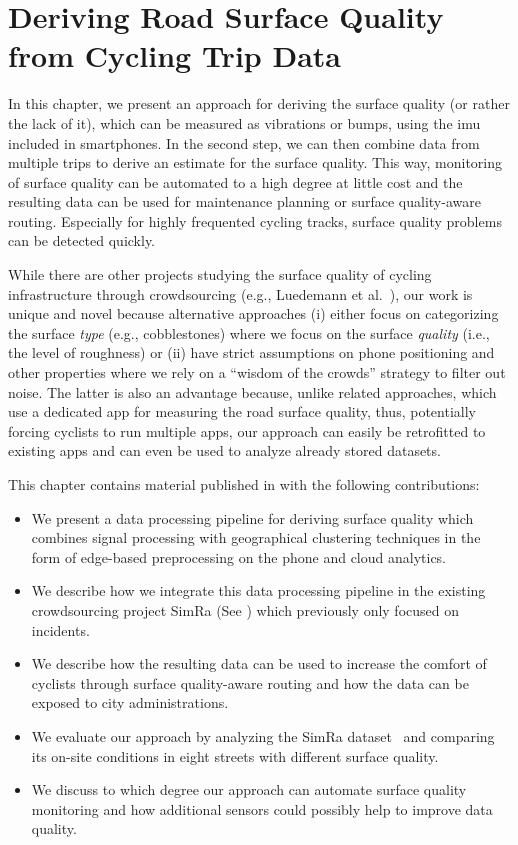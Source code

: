 \chapter{Deriving Road Surface Quality from Cycling Trip Data}
\label{cha:cyclequality}
In this chapter, we present an approach for deriving the surface quality (or rather the lack of it), which can be measured as vibrations or bumps, using the \ac{imu} included in smartphones.
In the second step, we can then combine data from multiple trips to derive an estimate for the surface quality.
This way, monitoring of surface quality can be automated to a high degree at little cost and the resulting data can be used for maintenance planning or surface quality-aware routing.
Especially for highly frequented cycling tracks, surface quality problems can be detected quickly.

While there are other projects studying the surface quality of cycling infrastructure through crowdsourcing (e.g., Luedemann et al.~\cite{luedemann2022bikevibes}), our work is unique and novel because alternative approaches (i) either focus on categorizing the surface \emph{type} (e.g., cobblestones) where we focus on the surface \emph{quality} (i.e., the level of roughness) or (ii) have strict assumptions on phone positioning and other properties where we rely on a ``wisdom of the crowds'' strategy to filter out noise.
The latter is also an advantage because, unlike related approaches, which use a dedicated app for measuring the road surface quality, thus, potentially forcing cyclists to run multiple apps, our approach can easily be retrofitted to existing apps and can even be used to analyze already stored datasets.

This chapter contains material published in \cite{karakaya2023crowdsensing} with the following contributions:
\begin{itemize}
	\item We present a data processing pipeline for deriving surface quality which combines signal processing with geographical clustering techniques in the form of edge-based preprocessing on the phone and cloud analytics.
	\item We describe how we integrate this data processing pipeline in the existing crowdsourcing project SimRa (See ) which previously only focused on incidents.
	\item We describe how the resulting data can be used to increase the comfort of cyclists through surface quality-aware routing and how the data can be exposed to city administrations.
	\item We evaluate our approach by analyzing the SimRa dataset~\cite{dataset_simra_set1,dataset_simra_set2,dataset_simra_set3} and comparing its on-site conditions in eight streets with different surface quality.
	\item We discuss to which degree our approach can automate surface quality monitoring and how additional sensors could possibly help to improve data quality.
\end{itemize}

